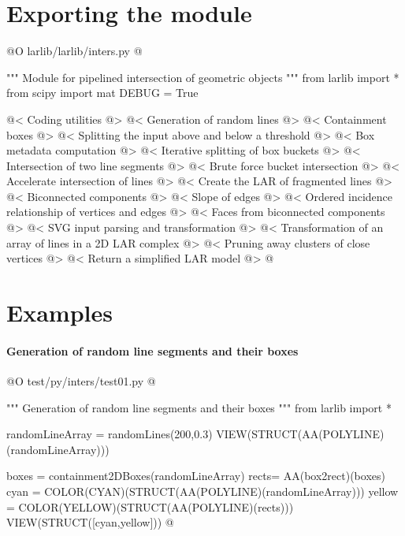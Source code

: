 \documentclass[11pt,oneside]{article}    %
\begin{document}
\section{Exporting the module}

@O larlib/larlib/inters.py
@{""" Module for pipelined intersection of geometric objects """
from larlib import *
from scipy import mat
DEBUG = True

@< Coding utilities @>
@< Generation of random lines @>
@< Containment boxes @>
@< Splitting the input above and below a threshold @>
@< Box metadata computation @>
@< Iterative splitting of box buckets @>
@< Intersection of two line segments @>
@< Brute force bucket intersection @>
@< Accelerate intersection of lines @>
@< Create the LAR of fragmented lines @>
@< Biconnected components @>
@< Slope of edges @>
@< Ordered incidence relationship of vertices and edges @>
@< Faces from biconnected components @>
@< SVG input parsing and transformation @>
@< Transformation of an array of lines in a 2D LAR complex @>
@< Pruning away clusters of close vertices @>
@< Return a simplified LAR model @>
@}


\section{Examples}




\paragraph{Generation of random line segments and their boxes}
@O test/py/inters/test01.py
@{""" Generation of random line segments and their boxes """
from larlib import *

randomLineArray = randomLines(200,0.3)
VIEW(STRUCT(AA(POLYLINE)(randomLineArray)))

boxes = containment2DBoxes(randomLineArray)
rects= AA(box2rect)(boxes)
cyan = COLOR(CYAN)(STRUCT(AA(POLYLINE)(randomLineArray)))
yellow = COLOR(YELLOW)(STRUCT(AA(POLYLINE)(rects)))
VIEW(STRUCT([cyan,yellow]))
@}
\end{document}
